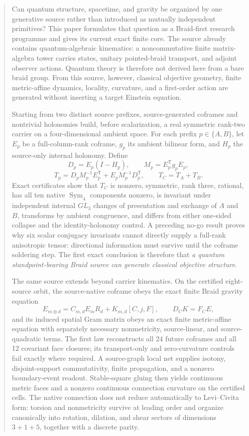 \documentclass[11pt]{article}
\theoremstyle{definition}
\theoremstyle{remark}
\newcommand{\Sym}{\operatorname{Sym}}
\begin{document}
\begin{abstract}
Can quantum structure, spacetime, and gravity be organized by one generative source rather than introduced as mutually independent primitives? This paper formulates that question as a Braid-first research programme and gives its current exact finite core. The source already contains quantum-algebraic kinematics: a noncommutative finite matrix-algebra tower carries states, unitary pointed-braid transport, and adjoint observer actions. Quantum theory is therefore not derived here from a bare braid group. From this source, however, classical objective geometry, finite metric-affine dynamics, locality, curvature, and a first-order action are generated without inserting a target Einstein equation.

Starting from two distinct source prefixes, source-generated coframes and nontrivial holonomies build, before scalarization, a real symmetric rank-two carrier on a four-dimensional ambient space. For each prefix $p\in\{A,B\}$, let $E_p$ be a full-column-rank coframe, $g_p$ its ambient bilinear form, and $H_p$ the source-only internal holonomy. Define
\[
 D_p=E_p(I-H_p),\qquad M_p=E_p^{\mathsf T}g_pE_p,
\]
\[
 T_p=D_pM_p^{-1}E_p^{\mathsf T}+E_pM_p^{-1}D_p^{\mathsf T},
 \qquad T_C=T_A+T_B.
\]
Exact certificates show that $T_C$ is nonzero, symmetric, rank three, rational, has all ten native $\Sym_4$ components nonzero, is invariant under independent internal $GL_3$ changes of presentation and exchange of $A$ and $B$, transforms by ambient congruence, and differs from either one-sided collapse and the identity-holonomy control. A preceding no-go result proves why six scalar conjugacy invariants cannot directly supply a full-rank anisotropic tensor: directional information must survive until the coframe soldering step. The first exact conclusion is therefore that \emph{a quantum standpoint-bearing Braid source can generate classical objective structure}.

The same source extends beyond carrier kinematics. On the certified eight-source orbit, the source-native coframe obeys the exact finite Braid gravity equation
\[
 E_{m\oplus d}=C_{m,d}E_mR_d+K_{m,d}[C,j,F],
 \qquad D_CK=F_CE,
\]
and its induced spatial Gram matrix obeys an exact finite metric-affine equation with separately necessary nonmetricity, source-linear, and source-quadratic terms. The first law reconstructs all 24 future coframes and all 12 covariant face closures; its transport-only and zero-curvature controls fail exactly where required. A source-graph local net supplies isotony, disjoint-support commutativity, finite propagation, and a nonzero boundary-event readout. Stable-square gluing then yields continuous metric faces and a nonzero continuous connection curvature on the certified cells. The native connection does not reduce automatically to Levi--Civita form: torsion and nonmetricity survive at leading order and organize canonically into rotation, dilation, and shear sectors of dimensions $3+1+5$, together with a discrete parity.


\end{abstract}
\end{document}
